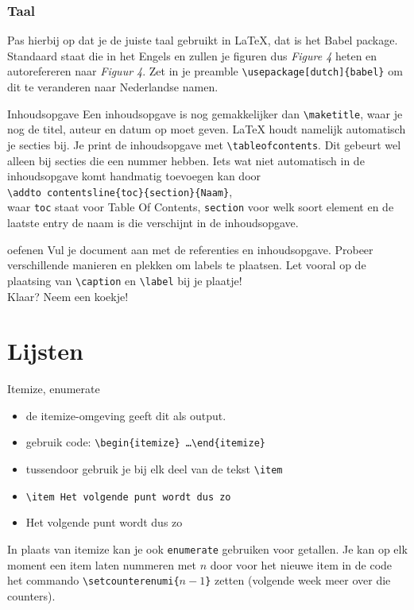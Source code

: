 \documentclass{beamer}
\begin{document}
\begin{frame}
	\frametitle{Taal}
	Pas hierbij op dat je de juiste taal gebruikt in \LaTeX, dat is het Babel package. Standaard staat die in het Engels en zullen je figuren dus \textit{Figure 4} heten en autorefereren naar \textit{Figuur 4}. Zet in je preamble \texttt{\textbackslash usepackage[dutch]\{babel\}} om dit te veranderen naar Nederlandse namen.
\end{frame}	

\begin{frame}{Inhoudsopgave}
	Een inhoudsopgave is nog gemakkelijker dan \texttt{\textbackslash maketitle}, waar je nog de titel, auteur en datum op moet geven. \LaTeX{} houdt namelijk automatisch je secties bij. Je print de inhoudsopgave met \texttt{\textbackslash tableofcontents}.
	Dit gebeurt wel alleen bij secties die een nummer hebben.
	Iets wat niet automatisch in de inhoudsopgave komt handmatig toevoegen kan door\\ \texttt{\textbackslash addto contentsline\{toc\}\{section\}\{Naam\}},\\ waar \texttt{toc} staat voor Table Of Contents, \texttt{section} voor welk soort element en de laatste entry de naam is die verschijnt in de inhoudsopgave.
\end{frame}

\begin{frame}{oefenen}
	Vul je document aan met de referenties en inhoudsopgave. Probeer verschillende manieren en plekken om labels te plaatsen. Let vooral op de plaatsing van \texttt{\textbackslash caption} en \texttt{\textbackslash label} bij je plaatje!\\
	Klaar? Neem een koekje!
\end{frame}

\section{Lijsten}
\begin{frame}{Itemize, enumerate}
	\begin{itemize}
		\item de itemize-omgeving geeft dit als output.
		\item gebruik code: \texttt{\textbackslash begin\{itemize\} \dots \textbackslash end\{itemize\}}
		\item tussendoor gebruik je bij elk deel van de tekst \texttt{\textbackslash item}
		\item \texttt{\textbackslash item Het volgende punt wordt dus zo}
		\item Het volgende punt wordt dus zo
	\end{itemize}
In plaats van itemize kan je ook \texttt{enumerate} gebruiken voor getallen. Je kan op elk moment een item laten nummeren met $n$ door voor het nieuwe item in de code het commando \texttt{\textbackslash setcounter{enumi}\{$n-1$\}} zetten (volgende week meer over die counters).
\end{frame}
\end{document}
